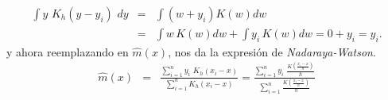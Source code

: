 \documentclass[12pt,letterpaper]{article}
\begin{document}
\begin{enumerate}
\begin{eqnarray*}
\int y \,\, K_{h}\left(y-y_{i}\right) \,\, dy&=& \int \left( w+y_{i} \right) K\left(w\right) dw\\
&=&   \int w\, K\left(w\right) dw + \int y_{i}\, K\left(w\right) dw =0+ y_{i}=y_{i}.
\end{eqnarray*}
y ahora reemplazando en $\hat{m}\left(x\right)$, nos da la expresi\'on de {\it Nadaraya-Watson}.
\begin{eqnarray*}
\hat{m}\left(x\right)&=&\frac{\sum_{i=1}^{n} y_{i} \,\, K_{h}\left(x_{i}-x\right)}{\sum_{i=1}^{n} K_{h}\left(x_{i}-x\right) } = \frac{\sum_{i=1}^{n} y_{i} \,\, \frac{K\left(\frac{x_{i}-x}{h}\right)}{h}}{\sum_{i=1}^{n} \frac{K\left(\frac{x_{i}-x}{h}\right)}{h}} \\
\end{eqnarray*}

\end{enumerate}
\end{document}
